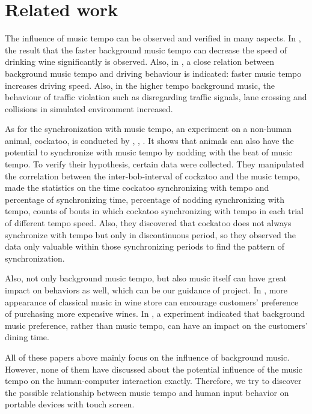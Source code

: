\section{Related work}

The influence of music tempo can be observed and verified in many aspects. In \cite{mcelrea:drinking}, the result that the faster background music tempo can decrease the speed of drinking wine significantly is observed. Also, in \cite{patel:non-human1}, a close relation between background music tempo and driving behaviour is indicated: faster music tempo increases driving speed. Also, in the higher tempo background music, the behaviour of traffic violation such as disregarding traffic signals, lane crossing and collisions in simulated environment increased. 

As for the synchronization with music tempo, an experiment on a non-human animal, cockatoo, is conducted by \cite{patel:non-human1}, \cite{patel:non-human2}, \cite{patel:non-human3}. It shows that animals can also have the potential to synchronize with music tempo by nodding with the beat of music tempo. To verify their hypothesis, certain data were collected. They manipulated the correlation between the inter-bob-interval of cockatoo and the music tempo, made the statistics on the time cockatoo synchronizing with tempo and percentage of synchronizing time, percentage of nodding synchronizing with tempo, counts of bouts in which cockatoo synchronizing with tempo in each trial of different tempo speed. Also, they discovered that cockatoo does not always synchronize with tempo but only in discontinuous period, so they observed the data only valuable within those synchronizing periods to find the pattern of synchronization.

Also, not only background music tempo, but also music itself can have great impact on behaviors as well, which can be our guidance of project. In \cite{areni:shopping}, more appearance of classical music in wine store can encourage customers' preference of purchasing more expensive wines. In \cite{Caldwell:dining}, a experiment indicated that background music preference, rather than music tempo, can have an impact on the customers' dining time. 

All of these papers above mainly focus on the influence of background music. However, none of them have discussed about the potential influence of the music tempo on the human-computer interaction exactly. Therefore, we try to discover the possible relationship between music tempo and human input behavior on portable devices with touch screen.
